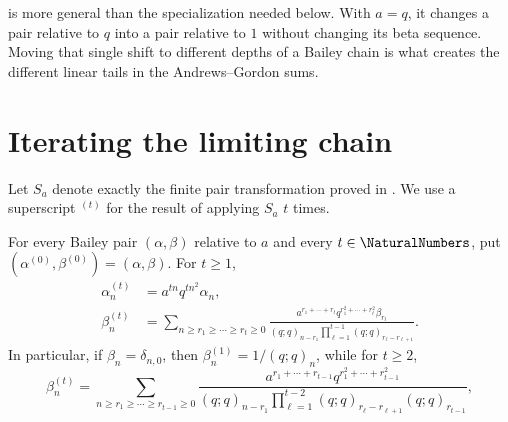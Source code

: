 \begin{remark}
 is more general than the
specialization needed below.  With \(a=q\), it changes a pair relative to
\(q\) into a pair relative to \(1\) without changing its beta sequence.
Moving that single shift to different depths of a Bailey chain is what
creates the different linear tails in the Andrews--Gordon sums.
\end{remark}

\section{Iterating the limiting chain}
\label{qg:sec:iterated-bailey-chain}

Let \(S_a\) denote exactly the finite pair transformation proved in
.  We use a superscript \(^{(t)}\) for
the result of applying \(S_a\) \(t\) times.

\begin{lemma}
\label{qg:lem-bailey-chain-iterate}
For every Bailey pair \((\alpha,\beta)\) relative to \(a\) and every
\(t\in\NaturalNumbers\), put
\((\alpha^{(0)},\beta^{(0)})=(\alpha,\beta)\).  For \(t\ge1\),
\begin{align}
 \alpha_n^{(t)}
 &=a^{tn}q^{tn^2}\alpha_n,
 \label{qg:eq:iterated-bailey-alpha}\\
 \beta_n^{(t)}
 &=
 \sum_{n\ge r_1\ge\cdots\ge r_t\ge0}
 \frac{
   a^{r_1+\cdots+r_t}
   q^{r_1^2+\cdots+r_t^2}\beta_{r_t}}
 {(q;q)_{n-r_1}
  \displaystyle\prod_{\ell=1}^{t-1}
  (q;q)_{r_\ell-r_{\ell+1}}}.
 \label{qg:eq:iterated-bailey-beta}
\end{align}
In particular, if \(\beta_n=\delta_{n,0}\), then
\(\beta_n^{(1)}=1/(q;q)_n\), while for \(t\ge2\),
\begin{equation}
 \beta_n^{(t)}
 =
 \sum_{n\ge r_1\ge\cdots\ge r_{t-1}\ge0}
 \frac{
   a^{r_1+\cdots+r_{t-1}}
   q^{r_1^2+\cdots+r_{t-1}^2}}
 {(q;q)_{n-r_1}
  \displaystyle\prod_{\ell=1}^{t-2}
  (q;q)_{r_\ell-r_{\ell+1}}
  (q;q)_{r_{t-1}}},
 \label{qg:eq:iterated-bailey-unit-beta}
\end{equation}
\end{lemma}


